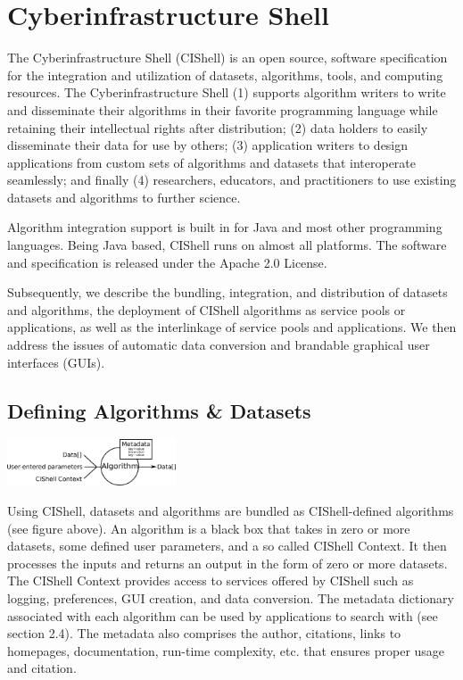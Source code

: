 \section{Cyberinfrastructure Shell}


The Cyberinfrastructure Shell (CIShell) \cite{cishell} is an open source, 
software specification for the integration and utilization of datasets, 
algorithms, tools, and computing resources. The Cyberinfrastructure Shell (1) 
supports algorithm writers to write and disseminate their algorithms in their 
favorite programming language while retaining their intellectual rights after 
distribution; (2) data holders to easily disseminate their data for use by 
others; (3) application writers to design applications from custom sets of 
algorithms and datasets that interoperate seamlessly; and finally (4) 
researchers, educators, and practitioners to use existing datasets and 
algorithms to further science.

Algorithm integration support is built in for Java and most other programming 
languages. Being Java based, CIShell runs on almost all platforms. The software 
and specification is released under the Apache 2.0 License.

Subsequently, we describe the bundling, integration, and distribution of 
datasets and algorithms, the deployment of CIShell algorithms as service pools 
or applications, as well as the interlinkage of service pools and applications. 
We then address the issues of automatic data conversion and brandable graphical 
user interfaces (GUIs).

\subsection{Defining Algorithms \& Datasets}

\begin{center}
\includegraphics[width=50mm]{graphics/algorithmDefn.png} 
\end{center}

Using CIShell, datasets and algorithms are bundled as CIShell-defined 
algorithms (see figure above). An algorithm is a black box that takes in 
zero or more datasets, some defined user parameters, and a so called CIShell 
Context. It then processes the inputs and returns an output in the form of zero 
or more datasets. The CIShell Context provides access to services offered by 
CIShell such as logging, preferences, GUI creation, and data conversion. The 
metadata dictionary associated with each algorithm can be used by applications 
to search with (see section 2.4). The metadata also comprises the author, 
citations, links to homepages, documentation, run-time complexity, etc. that 
ensures proper usage and citation.

